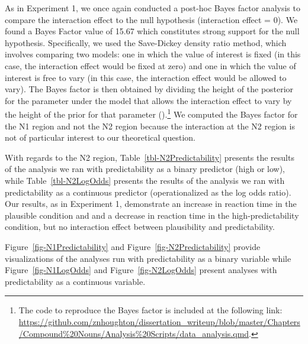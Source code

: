 \documentclass[
  12pt,
  letterpaper,
]{scrreport}
\begin{document}
As in Experiment 1, we once again conducted a post-hoc Bayes factor
analysis to compare the interaction effect to the null hypothesis
(interaction effect = 0). We found a Bayes Factor value of 15.67 which
constitutes strong support for the null hypothesis. Specifically, we
used the Save-Dickey density ratio method, which involves comparing two
models: one in which the value of interest is fixed (in this case, the
interaction effect would be fixed at zero) and one in which the value of
interest is free to vary (in this case, the interaction effect would be
allowed to vary). The Bayes factor is then obtained by dividing the
height of the posterior for the parameter under the model that allows
the interaction effect to vary by the height of the prior for that
parameter
().\footnote{The code to reproduce the Bayes factor is included
  at the following link:
  \url{https://github.com/znhoughton/dissertation_writeup/blob/master/Chapters/Compound\%20Nouns/Analysis\%20Scripts/data_analysis.qmd}.}
We computed the Bayes factor for the N1 region and not the N2 region
because the interaction at the N2 region is not of particular interest
to our theoretical question.

With regards to the N2 region, Table~\ref{tbl-N2Predictability} presents
the results of the analysis we ran with predictability as a binary
predictor (high or low), while Table~\ref{tbl-N2LogOdds} presents the
results of the analysis we ran with predictability as a continuous
predictor (operationalized as the log odds ratio). Our results, as in
Experiment 1, demonstrate an increase in reaction time in the plausible
condition and and a decrease in reaction time in the high-predictability
condition, but no interaction effect between plausibility and
predictability.

Figure~\ref{fig-N1Predictability} and Figure~\ref{fig-N2Predictability}
provide visualizations of the analyses run with predictability as a
binary variable while Figure~\ref{fig-N1LogOdds} and
Figure~\ref{fig-N2LogOdds} present analyses with predictability as a
continuous variable.
\end{document}
